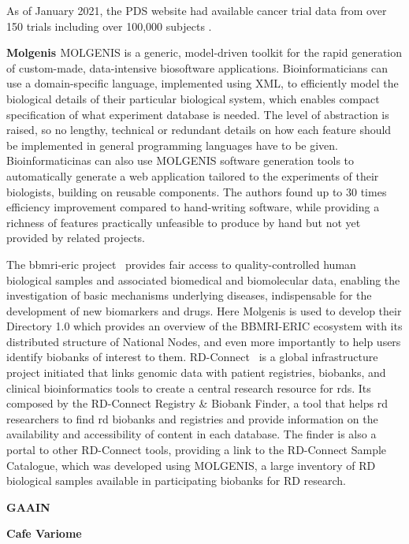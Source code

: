 As of January 2021, the PDS website had available cancer trial data from over 150
trials including over 100,000 subjects \cite{datasphere-site}.

\textbf{Molgenis \cite{molgenis}}
MOLGENIS is a generic, model-driven toolkit for the rapid generation of custom-made,
data-intensive biosoftware applications.
Bioinformaticians can use a domain-specific language, implemented using XML, to
efficiently model the biological details of their particular biological system, which
enables compact specification of what experiment database is needed.
The level of abstraction is raised, so no lengthy, technical or redundant details on
how each feature should be implemented in general programming languages have to be
given.
Bioinformaticinas can also use MOLGENIS software generation tools to automatically
generate a web application tailored to the experiments of their biologists, building on
reusable components.
The authors found up to 30 times efficiency improvement compared to hand-writing
software, while providing a richness of features practically unfeasible to produce by
hand but not yet provided by related projects.

The \gls{bbmri-eric} project~\cite{bbmrieric} provides fair access to
quality-controlled human biological samples and associated biomedical and biomolecular
data, enabling the investigation of basic mechanisms underlying diseases, indispensable
for the development of new biomarkers and drugs.
Here Molgenis is used to develop their Directory 1.0 which provides an overview of the
BBMRI-ERIC ecosystem with its distributed structure of National Nodes, and even more
importantly to help users identify biobanks of interest to them.
RD-Connect~\cite{rdconnect} is a global infrastructure project initiated that links
genomic data with patient registries, biobanks, and clinical bioinformatics tools to
create a central research resource for \gls{rd}s.
Its composed by the RD-Connect Registry \& Biobank Finder, a tool that helps \gls{rd}
researchers to find \gls{rd} biobanks and registries and provide information on the
availability and accessibility of content in each database.
The finder is also a portal to other RD-Connect tools, providing a link to the
RD-Connect Sample Catalogue, which was developed using MOLGENIS, a large inventory of
RD biological samples available in participating biobanks for RD research. 


\textbf{GAAIN \cite{gaain}}

\textbf{Cafe Variome \cite{cafevariome}}

